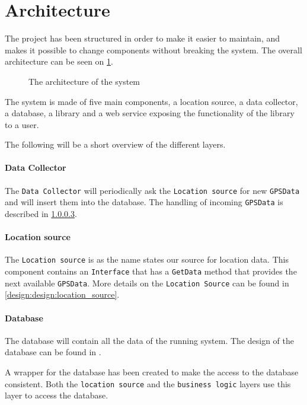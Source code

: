 \section{Architecture}

The project has been structured in order to make it easier to maintain, and makes it possible to change components without breaking the system.
The overall architecture can be seen on \cref{arch}.

\begin{figure}[h]
\center

\caption{The architecture of the system}
\label{arch}
\end{figure}

The system is made of five main components, a location source, a data collector, a database, a library and a web service exposing the functionality of the library to a user.

The following will be a short overview of the different layers.

\paragraph{Data Collector}
The \texttt{Data Collector} will periodically ask the \texttt{Location source} for new \texttt{GPSData} and will insert them into the database. 
The handling of incoming \texttt{GPSData} is described in  \cref{}.

\paragraph{Location source}
The \texttt{Location source} is as the name states our source for location data.
This component contains an \texttt{Interface} that has a \texttt{GetData} method that provides the next available \texttt{GPSData}.
More details on the \texttt{Location Source} can be found in \cref{design:design:location_source}.


\paragraph{Database}
The database will contain all the data of the running system.
The design of the database can be found in .

A wrapper for the database has been created to make the access to the database consistent. 
Both the \texttt{location source} and the \texttt{business logic} layers use this layer to access the database.

